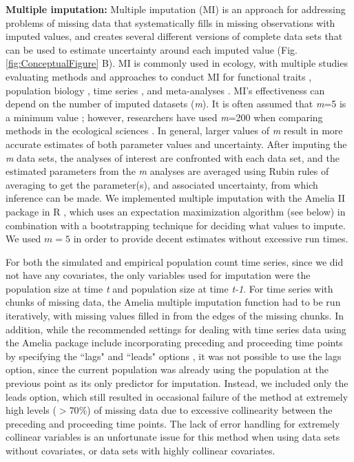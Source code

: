 \documentclass{article}
\begin{document}
\noindent\textbf{Multiple imputation: }Multiple imputation (MI) is an approach for addressing problems of missing data that systematically fills in missing observations with imputed values, and creates several different versions of complete data sets that can be used to estimate uncertainty around each imputed value (Fig. \ref{fig:ConceptualFigure} B). MI is commonly used in ecology, with multiple studies evaluating methods and approaches to conduct MI for functional traits \citep{taugourdeau_filling_2014,johnson_handling_2021,penone_imputation_2014}, population biology \citep{onkelinx_working_2017}, time series \citep{hui_gap-filling_2004}, and meta-analyses \citep{ellington_using_2015}.  MI’s effectiveness can depend on the number of imputed datasets (\textit{m}). It is often assumed that \textit{m}=5 is a minimum value \citep{honaker_what_2010}; however, researchers have used \textit{m}=200 when comparing methods in the ecological sciences \citep{onkelinx_working_2017}. In general, larger values of \textit{m} result in more accurate estimates of both parameter values and uncertainty. %
After imputing the \textit{m} data sets, the analyses of interest are confronted with each data set, and the estimated parameters from the \textit{m} analyses are averaged using Rubin rules of averaging to get the parameter(s), and associated uncertainty, from which inference can be made. We implemented multiple imputation with the Amelia II package in R \citep{honaker2011}, which uses an expectation maximization algorithm (see below) in combination with a bootstrapping technique for deciding what values to impute. We used $m=5$ in order to provide decent estimates without excessive run times.

For both the simulated and empirical population count time series, since we did not have any covariates, the only variables used for imputation were the population size at time \textit{t} and population size at time \textit{t-1}. For time series with chunks of missing data, the Amelia multiple imputation function had to be run iteratively, with missing values filled in from the edges of the missing chunks. In addition, while the recommended settings for dealing with time series data using the Amelia package include incorporating preceding and proceeding time points by specifying the ``lags" and ``leads" options \citep{honaker2011}, it was not possible to use the lags option, since the current population was already using the population at the previous point as its only predictor for imputation. Instead, we included only the leads option, which still resulted in occasional failure of the method at extremely high levels ($>70\%$) of missing data due to excessive collinearity between the preceding and proceeding time points. The lack of error handling for extremely collinear variables is an unfortunate issue for this method when using data sets without covariates, or data sets with highly collinear covariates.  
\end{document}
